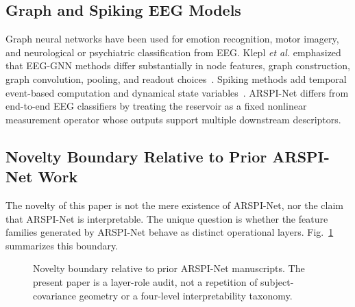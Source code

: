 \documentclass[journal]{IEEEtran}
\begin{document}
\subsection{Graph and Spiking EEG Models}
Graph neural networks have been used for emotion recognition, motor imagery, and neurological or psychiatric classification from EEG. Klepl \emph{et al.} emphasized that EEG-GNN methods differ substantially in node features, graph construction, graph convolution, pooling, and readout choices~\cite{klepl2024gnn}. Spiking methods add temporal event-based computation and dynamical state variables~\cite{maass2002liquid,gong2023sglnet}. ARSPI-Net differs from end-to-end EEG classifiers by treating the reservoir as a fixed nonlinear measurement operator whose outputs support multiple downstream descriptors.

\subsection{Novelty Boundary Relative to Prior ARSPI-Net Work}
The novelty of this paper is not the mere existence of ARSPI-Net, nor the claim that ARSPI-Net is interpretable. The unique question is whether the feature families generated by ARSPI-Net behave as distinct operational layers. Fig.~\ref{fig:novelty_boundary} summarizes this boundary.

\begin{figure}[!t]
\centering
{}
\caption{Novelty boundary relative to prior ARSPI-Net manuscripts. The present paper is a layer-role audit, not a repetition of subject-covariance geometry or a four-level interpretability taxonomy.}
\label{fig:novelty_boundary}
\end{figure}
\end{document}
